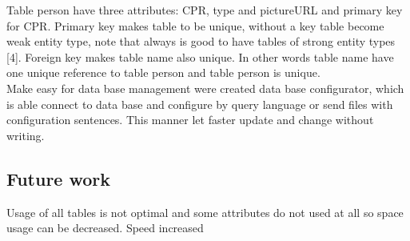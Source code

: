 Table person have three attributes: CPR, type and pictureURL and primary key for CPR. Primary key makes table to be unique, without a key table become weak entity type, note that always is good to have tables of strong entity types [4]. Foreign key makes table name also unique. In other words table name have one unique reference to table person and table person is unique. \\ Make easy for data base management were created data base configurator, which is able connect to data base and configure by query language or send files with configuration sentences. This manner let faster update and change without writing. 

\subsection{Future work}

Usage of all tables is not optimal and some attributes do not used at all so space usage can be decreased.
Speed increased